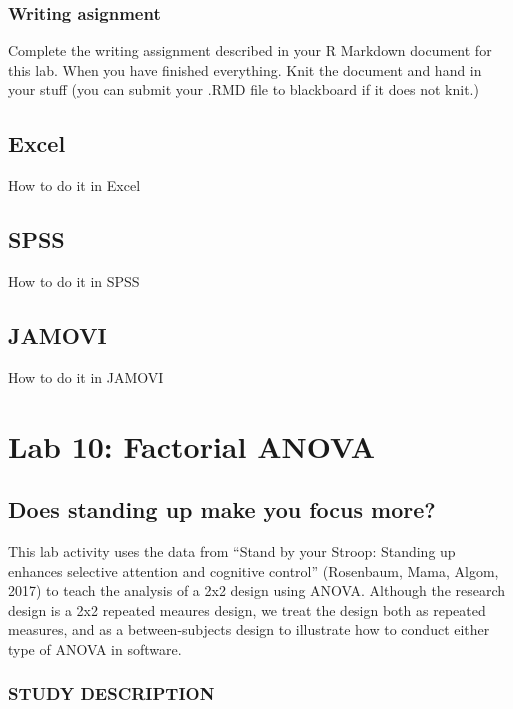 \documentclass[]{book}
\theoremstyle{definition}
\theoremstyle{definition}
\theoremstyle{definition}
\theoremstyle{remark}
\begin{document}
\subsection{Writing asignment}\label{writing-asignment-6}

Complete the writing assignment described in your R Markdown document
for this lab. When you have finished everything. Knit the document and
hand in your stuff (you can submit your .RMD file to blackboard if it
does not knit.)

\section{Excel}\label{excel-8}

How to do it in Excel

\section{SPSS}\label{spss-8}

How to do it in SPSS

\section{JAMOVI}\label{jamovi-8}

How to do it in JAMOVI

\chapter{Lab 10: Factorial ANOVA}\label{lab-10-factorial-anova}

\section{Does standing up make you focus
more?}\label{does-standing-up-make-you-focus-more}

This lab activity uses the data from ``Stand by your Stroop: Standing up
enhances selective attention and cognitive control'' (Rosenbaum, Mama,
Algom, 2017) to teach the analysis of a 2x2 design using ANOVA. Although
the research design is a 2x2 repeated meaures design, we treat the
design both as repeated measures, and as a between-subjects design to
illustrate how to conduct either type of ANOVA in software.

\subsection{STUDY DESCRIPTION}\label{study-description-4}
\end{document}
